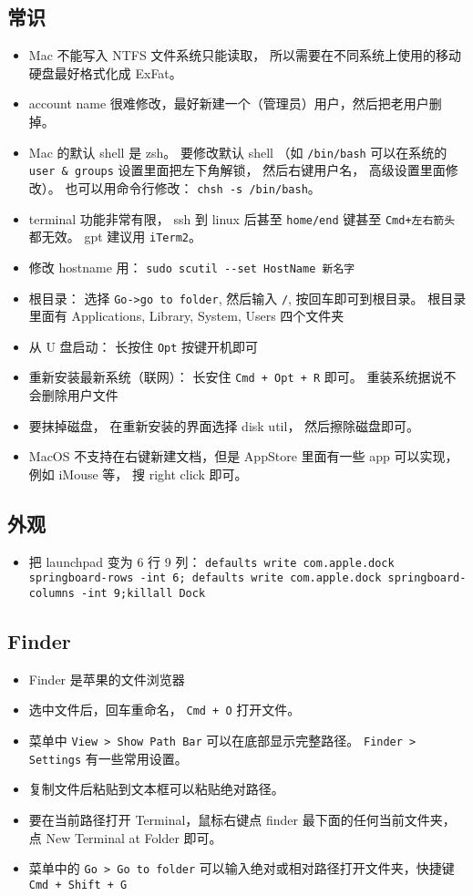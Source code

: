 \subsection{常识}
\begin{itemize}
\item Mac 不能写入 NTFS 文件系统只能读取， 所以需要在不同系统上使用的移动硬盘最好格式化成 ExFat。
\item account name 很难修改，最好新建一个（管理员）用户，然后把老用户删掉。
\item Mac 的默认 shell 是 zsh。 要修改默认 shell （如 \verb|/bin/bash| 可以在系统的 \verb|user & groups| 设置里面把左下角解锁， 然后右键用户名， 高级设置里面修改）。 也可以用命令行修改： \verb|chsh -s /bin/bash|。
\item terminal 功能非常有限， ssh 到 linux 后甚至 \verb|home/end| 键甚至 \verb|Cmd+左右箭头| 都无效。 gpt 建议用 \verb|iTerm2|。
\item 修改 hostname 用： \verb|sudo scutil --set HostName 新名字|
\item 根目录： 选择 \verb|Go->go to folder|, 然后输入 \verb|/|, 按回车即可到根目录。 根目录里面有 Applications, Library, System, Users 四个文件夹
\item 从 U 盘启动： 长按住 \verb`Opt` 按键开机即可
\item 重新安装最新系统（联网）： 长安住 \verb|Cmd + Opt + R| 即可。 重装系统据说不会删除用户文件
\item 要抹掉磁盘， 在重新安装的界面选择 disk util， 然后擦除磁盘即可。
\item MacOS 不支持在右键新建文档，但是 AppStore 里面有一些 app 可以实现， 例如 iMouse 等， 搜 right click 即可。
\end{itemize}

\subsection{外观}
\begin{itemize}
\item 把 launchpad 变为 6 行 9 列： \verb`defaults write com.apple.dock springboard-rows -int 6; defaults write com.apple.dock springboard-columns -int 9;killall Dock`
\end{itemize}

\subsection{Finder}
\begin{itemize}
\item Finder 是苹果的文件浏览器
\item 选中文件后，回车重命名， \verb`Cmd + O` 打开文件。
\item 菜单中 \verb|View > Show Path Bar| 可以在底部显示完整路径。 \verb`Finder > Settings` 有一些常用设置。
\item 复制文件后粘贴到文本框可以粘贴绝对路径。
\item 要在当前路径打开 Terminal，鼠标右键点 finder 最下面的任何当前文件夹，点 New Terminal at Folder 即可。
\item 菜单中的 \verb`Go > Go to folder` 可以输入绝对或相对路径打开文件夹，快捷键 \verb`Cmd + Shift + G`
\end{itemize}

